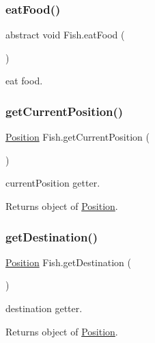\subsubsection{\texorpdfstring{eat\+Food()}{eatFood()}}
{\footnotesize\ttfamily abstract void Fish.\+eat\+Food (\begin{DoxyParamCaption}{ }\end{DoxyParamCaption})\hspace{0.3cm}{\ttfamily [abstract]}}

eat food. \mbox{\label{class_fish_afc0c0824c91f3bbb61fc3762b08d9137}} 
\subsubsection{\texorpdfstring{get\+Current\+Position()}{getCurrentPosition()}}
{\footnotesize\ttfamily \mbox{\hyperlink{class_position}{Position}} Fish.\+get\+Current\+Position (\begin{DoxyParamCaption}{ }\end{DoxyParamCaption})\hspace{0.3cm}{\ttfamily [inline]}}

current\+Position getter. \begin{DoxyReturn}{Returns}
object of \mbox{\hyperlink{class_position}{Position}}. 
\end{DoxyReturn}
\mbox{\label{class_fish_a39feef3e603de6ea5931ada8b3e1e27d}} 
\subsubsection{\texorpdfstring{get\+Destination()}{getDestination()}}
{\footnotesize\ttfamily \mbox{\hyperlink{class_position}{Position}} Fish.\+get\+Destination (\begin{DoxyParamCaption}{ }\end{DoxyParamCaption})\hspace{0.3cm}{\ttfamily [inline]}}

destination getter. \begin{DoxyReturn}{Returns}
object of \mbox{\hyperlink{class_position}{Position}}. 
\end{DoxyReturn}
\mbox{\label{class_fish_a5ed789451c5b7fc9808de4837f06eb02}} 
